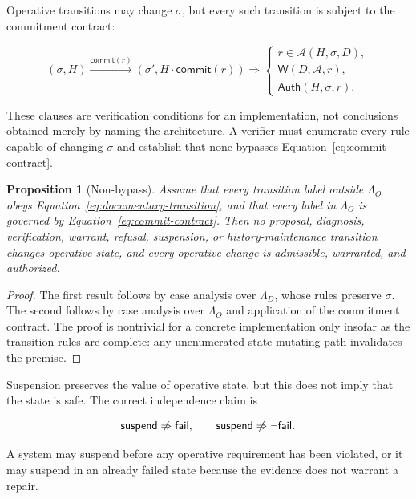 \documentclass[11pt]{article}
\newtheorem{proposition}{Proposition}
\begin{document}
Operative transitions may change $\sigma$, but every such transition is subject to the commitment contract:

\begin{equation}
(\sigma,H)\xrightarrow{\mathsf{commit}(r)}
(\sigma',H\cdot\mathsf{commit}(r))
\Longrightarrow
\begin{cases}
r\in\mathcal A(H,\sigma,D),\\
\mathsf W(D,\mathcal A,r),\\
\mathsf{Auth}(H,\sigma,r).
\end{cases}
\label{eq:commit-contract}
\end{equation}

These clauses are verification conditions for an implementation, not conclusions obtained merely by naming the architecture. A verifier must enumerate every rule capable of changing $\sigma$ and establish that none bypasses Equation~\eqref{eq:commit-contract}.

\begin{proposition}[Non-bypass]
Assume that every transition label outside $\Lambda_O$ obeys Equation~\eqref{eq:documentary-transition}, and that every label in $\Lambda_O$ is governed by Equation~\eqref{eq:commit-contract}. Then no proposal, diagnosis, verification, warrant, refusal, suspension, or history-maintenance transition changes operative state, and every operative change is admissible, warranted, and authorized.
\end{proposition}

\begin{proof}
The first result follows by case analysis over $\Lambda_D$, whose rules preserve $\sigma$. The second follows by case analysis over $\Lambda_O$ and application of the commitment contract. The proof is nontrivial for a concrete implementation only insofar as the transition rules are complete: any unenumerated state-mutating path invalidates the premise.
\end{proof}

Suspension preserves the value of operative state, but this does not imply that the state is safe. The correct independence claim is

\begin{equation}
\mathsf{suspend}\centernot\Rightarrow\mathsf{fail},
\qquad
\mathsf{suspend}\centernot\Rightarrow\neg\mathsf{fail}.
\label{eq:suspend-fail-independence}
\end{equation}

A system may suspend before any operative requirement has been violated, or it may suspend in an already failed state because the evidence does not warrant a repair.
\end{document}
